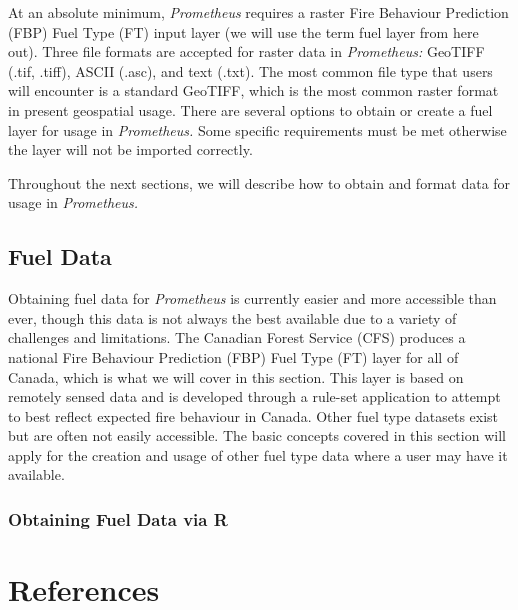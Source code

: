 \documentclass[
  letterpaper,
  DIV=11,
  numbers=noendperiod]{scrreprt}
\begin{document}
At an absolute minimum, \emph{Prometheus} requires a raster Fire
Behaviour Prediction (FBP) Fuel Type (FT) input layer (we will use the
term fuel layer from here out). Three file formats are accepted for
raster data in \emph{Prometheus:} GeoTIFF (.tif, .tiff), ASCII (.asc),
and text (.txt). The most common file type that users will encounter is
a standard GeoTIFF, which is the most common raster format in present
geospatial usage. There are several options to obtain or create a fuel
layer for usage in \emph{Prometheus.} Some specific requirements must be
met otherwise the layer will not be imported correctly.

Throughout the next sections, we will describe how to obtain and format
data for usage in \emph{Prometheus.}

\section{Fuel Data}\label{fuel-data}

Obtaining fuel data for \emph{Prometheus} is currently easier and more
accessible than ever, though this data is not always the best available
due to a variety of challenges and limitations. The Canadian Forest
Service (CFS) produces a national Fire Behaviour Prediction (FBP) Fuel
Type (FT) layer for all of Canada, which is what we will cover in this
section. This layer is based on remotely sensed data and is developed
through a rule-set application to attempt to best reflect expected fire
behaviour in Canada. Other fuel type datasets exist but are often not
easily accessible. The basic concepts covered in this section will apply
for the creation and usage of other fuel type data where a user may have
it available.

\subsection{Obtaining Fuel Data via R}\label{obtaining-fuel-data-via-r}


\chapter*{References}\label{references}


\protect{}\label{refs}
\end{document}
